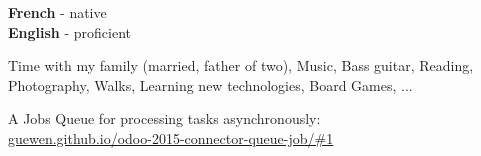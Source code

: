 \documentclass[9pt]{developercv} %
\begin{document}

\begin{minipage}[t]{0.3\textwidth}
	\vspace{-\baselineskip} %

	
	\textbf{French} - native\\
	\textbf{English} - proficient\\
\end{minipage}
\hfill
\begin{minipage}[t]{0.3\textwidth}
	\vspace{-\baselineskip} %
	
	
  Time with my family (married, father of two), Music, Bass guitar, Reading, 
  Photography, Walks, Learning new technologies, Board Games, ...
\end{minipage}
\hfill
\begin{minipage}[t]{0.3\textwidth}
	\vspace{-\baselineskip} %
	

  {A Jobs Queue for processing tasks asynchronously}:\\
  {\href{https://guewen.github.io/odoo-2015-connector-queue-job/#1}{guewen.github.io/odoo-2015-connector-queue-job/\#1}}

\end{minipage}

\end{document}
